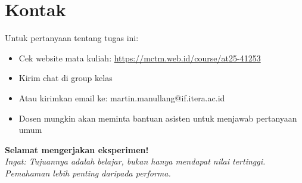 \documentclass[12pt,a4paper]{article}
\begin{document}
\section{Kontak}

Untuk pertanyaan tentang tugas ini:
\begin{itemize}
    \item Cek website mata kuliah: \url{https://mctm.web.id/course/at25-41253}
    \item Kirim chat di group kelas
    \item Atau kirimkan email ke: martin.manullang@if.itera.ac.id
    \item Dosen mungkin akan meminta bantuan asisten untuk menjawab pertanyaan umum
\end{itemize}

\vspace{1cm}

\begin{center}
\textbf{Selamat mengerjakan eksperimen!} \\
\textit{Ingat: Tujuannya adalah belajar, bukan hanya mendapat nilai tertinggi.} \\
\textit{Pemahaman lebih penting daripada performa.}
\end{center}
\end{document}
